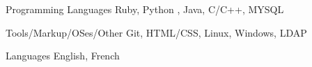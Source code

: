 

\begin{cvskills}

  \cvskill
    {Programming Languages} %
    {Ruby, Python , Java, C/C++, MYSQL} %

  \cvskill
    {Tools/Markup/OSes/Other} %
    {Git, HTML/CSS, Linux, Windows, LDAP} %

  \cvskill
    {Languages} %
    {English, French} %

\end{cvskills}